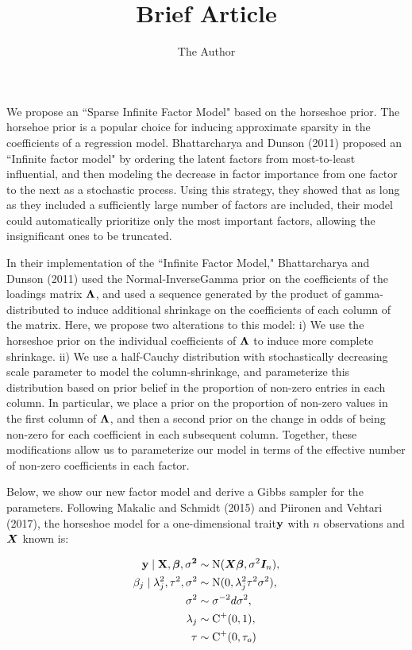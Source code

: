\documentclass[11pt]{amsart}
\title{Brief Article}
\author{The Author}
\newcommand*{\B}[1]{\ifmmode\bm{#1}\else\textbf{#1}\fi}
\begin{document}
We propose an ``Sparse Infinite Factor Model" based on the horseshoe prior. 
The horsehoe prior is a popular choice for inducing approximate sparsity in the coefficients of a regression model. 
Bhattarcharya and Dunson (2011) proposed an ``Infinite factor model" by ordering the latent factors from most-to-least
influential, and then modeling the decrease in factor importance from one factor to the next as a stochastic process. Using this strategy,
they showed that as long as they included a sufficiently large number of factors are included, their model could automatically prioritize 
only the most important factors, allowing the insignificant ones to be truncated.

In their implementation of the ``Infinite Factor Model," Bhattarcharya and Dunson (2011) used the Normal-InverseGamma prior on the 
coefficients of the loadings matrix $\B\Lambda$, and used a sequence generated by the product of gamma-distributed to induce additional shrinkage on the coefficients of each column of the matrix. Here, we propose two alterations to this model: i) We use the horseshoe prior on the individual coefficients of $\B\Lambda$ to induce more complete shrinkage. ii) We use a half-Cauchy distribution with stochastically decreasing scale parameter to model the column-shrinkage, and parameterize this distribution based on prior belief in the proportion of non-zero entries in each column. In particular, we place a prior on the proportion of non-zero values in the first column of $\B\Lambda$, and then a second prior on the change in odds of being non-zero for each coefficient in each subsequent column. Together, these modifications allow us to parameterize our model in terms of the effective number of non-zero coefficients in each factor.

Below, we show our new factor model and derive a Gibbs sampler for the parameters.
Following Makalic and Schmidt (2015) and Piironen and Vehtari (2017), the horseshoe model for a one-dimensional trait$\bf y$  with $n$ observations and $\B X$ known is:

\begin{align}
\begin{split}
\label{horseshoe_regression}
\bf y \mid \B{X},\B{\beta},\sigma^2 &\sim \mbox{N}(\B{X\beta},\sigma^2\B{I}_n), \\
\beta_j \mid \lambda^2_j, \tau^2, \sigma^2 &\sim \mbox{N}(0,\lambda^2_j \tau^2 \sigma^2), \\
\sigma^2 &\sim \sigma^{-2}d\sigma^2, \\
\lambda_j &\sim \mbox{C}^+(0,1), \\
\tau &\sim \mbox{C}^+(0,\tau_o)
\end{split}
\end{align}
\end{document}
